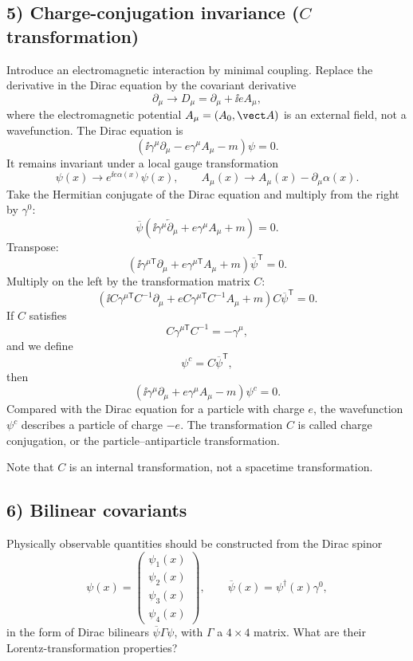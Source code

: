 \subsection*{5) Charge-conjugation invariance ($C$ transformation)}
Introduce an electromagnetic interaction by minimal coupling. Replace the derivative in the Dirac equation by the covariant derivative
\[
\partial_\mu\longrightarrow D_\mu=\partial_\mu+\ii e A_\mu,
\]
where the electromagnetic potential $A_\mu=(A_0,\vect A)$ is an external field, not a wavefunction. The Dirac equation is
\[
(\ii\gamma^\mu\partial_\mu-e\gamma^\mu A_\mu-m)\psi=0.
\]
It remains invariant under a local gauge transformation
\[
\psi(x)\longrightarrow e^{\ii e\alpha(x)}\psi(x),\qquad
A_\mu(x)\longrightarrow A_\mu(x)-\partial_\mu\alpha(x).
\]
Take the Hermitian conjugate of the Dirac equation and multiply from the right by $\gamma^0$:
\[
\overline\psi\left(\ii\gamma^\mu\overleftarrow\partial_\mu
+e\gamma^\mu A_\mu+m\right)=0.
\]
Transpose:
\[
\left(\ii\gamma^{\mu\mathsf T}\partial_\mu
+e\gamma^{\mu\mathsf T}A_\mu+m\right)\overline\psi^{\mathsf T}=0.
\]
Multiply on the left by the transformation matrix $C$:
\[
\left(\ii C\gamma^{\mu\mathsf T}C^{-1}\partial_\mu
+eC\gamma^{\mu\mathsf T}C^{-1}A_\mu+m\right)C\overline\psi^{\mathsf T}=0.
\]
If $C$ satisfies
\[
C\gamma^{\mu\mathsf T}C^{-1}=-\gamma^\mu,
\]
and we define
\[
\psi^c=C\overline\psi^{\mathsf T},
\]
then
\[
(\ii\gamma^\mu\partial_\mu+e\gamma^\mu A_\mu-m)\psi^c=0.
\]
Compared with the Dirac equation for a particle with charge $e$, the wavefunction $\psi^c$ describes a particle of charge $-e$. The transformation $C$ is called charge conjugation, or the particle--antiparticle transformation.

Note that $C$ is an internal transformation, not a spacetime transformation.

\subsection*{6) Bilinear covariants}
Physically observable quantities should be constructed from the Dirac spinor
\[
\psi(x)=\begin{pmatrix}\psi_1(x)\\\psi_2(x)\\\psi_3(x)\\\psi_4(x)\end{pmatrix},
\qquad \overline\psi(x)=\psi^\dagger(x)\gamma^0,
\]
in the form of Dirac bilinears $\overline\psi\Gamma\psi$, with $\Gamma$ a $4\times4$ matrix. What are their Lorentz-transformation properties?

